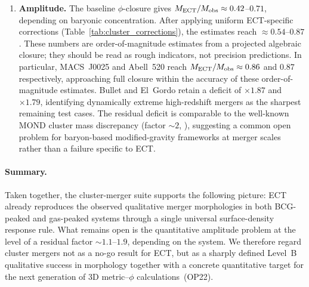 \documentclass[11pt,a4paper]{article}
\numberwithin{equation}{section}
\begin{document}
\begin{enumerate}[label=(\roman*)]
\item \textbf{Amplitude.}
  The baseline $\phi$-closure gives
  $M_{\rm ECT}/M_{\rm obs}\approx0.42$--$0.71$, depending on
  baryonic concentration.
  After applying uniform ECT-specific corrections
  (Table~\ref{tab:cluster_corrections}), the estimates reach
  $\approx0.54$--$0.87$.
  These numbers are order-of-magnitude estimates from a projected
  algebraic closure; they should be read as rough indicators, not
  precision predictions.
  In particular, MACS~J0025 and Abell~520 reach
  $M_{\rm ECT}/M_{\rm obs}\approx0.86$ and $0.87$ respectively,
  approaching full closure within the accuracy of these
  order-of-magnitude estimates.
  Bullet and El~Gordo retain a deficit of $\times1.87$ and
  $\times1.79$, identifying dynamically extreme high-redshift
  mergers as the sharpest remaining test cases.
  The residual deficit is comparable to the well-known MOND
  cluster mass discrepancy (factor $\sim\!2$,
  \cite{Sanders2003,Angus2008}), suggesting a common open
  problem for baryon-based modified-gravity frameworks at merger
  scales rather than a failure specific to ECT.
\end{enumerate}

\paragraph{Summary.}
Taken together, the cluster-merger suite supports the following
picture: ECT already reproduces the observed qualitative merger
morphologies in both BCG-peaked and gas-peaked systems through a
single universal surface-density response rule.
What remains open is the quantitative amplitude problem at the
level of a residual factor $\sim1.1$--$1.9$, depending on the
system.
We therefore regard cluster mergers not as a no-go result for ECT,
but as a sharply defined Level~B qualitative success in morphology
together with a concrete quantitative target for the next
generation of 3D metric--$\phi$ calculations~(OP22).
\end{document}
